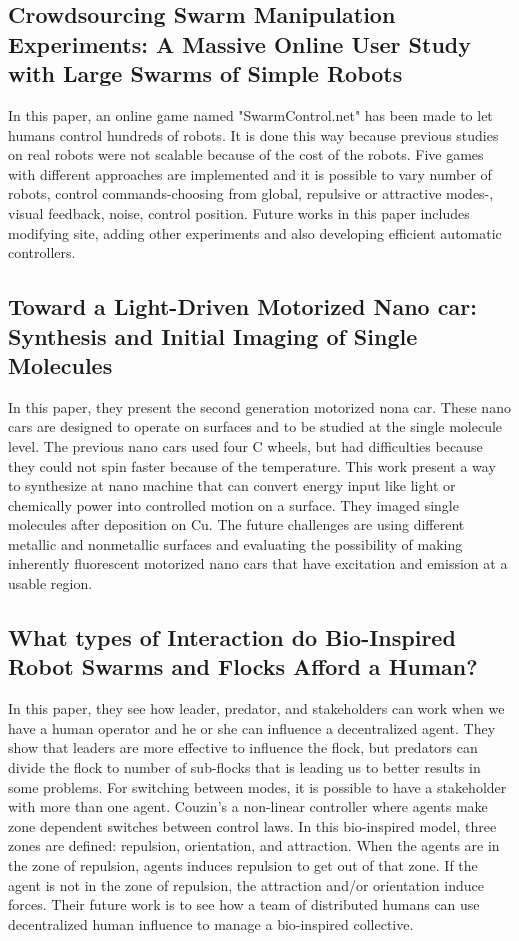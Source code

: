\documentclass[letterpaper, 10 pt, conference]{ieeeconf}
\begin{document}
\subsection{Crowdsourcing Swarm Manipulation Experiments: A Massive Online User Study with Large Swarms of Simple Robots}

In this paper, an online game named "SwarmControl.net" has been made to let humans control hundreds of robots. It is done this way because previous studies on real robots were not scalable because of the cost of the robots. Five games with different approaches are implemented and it is possible to vary number of robots, control commands-choosing from global, repulsive or attractive modes-, visual feedback, noise, control position. Future works in this paper includes modifying site, adding other experiments and also developing efficient automatic controllers. \cite{swarmcontrol2013}

\subsection{Toward a Light-Driven Motorized Nano car: Synthesis and Initial Imaging of Single Molecules}

In this paper, they present the second generation motorized nona car. These nano cars are designed to operate on surfaces and to be studied at the single molecule level. The previous nano cars used four C wheels, but had difficulties because they could not spin faster because of the temperature. This work present a way to synthesize at nano machine that can convert energy input like light or chemically power into controlled motion on a surface. They imaged single molecules after deposition on Cu. The future challenges are using different metallic and nonmetallic surfaces and evaluating the possibility of making inherently fluorescent motorized nano cars that have excitation and emission at a usable region. \cite{TourNanocar2012}

\subsection{What types of Interaction do Bio-Inspired Robot Swarms and Flocks Afford a Human?}

In this paper, they see how leader, predator, and stakeholders can work when we have a human operator and he or she can influence a decentralized agent. They show that leaders are more effective to influence the flock, but predators can divide the flock to number of sub-flocks that is leading us to better results in some problems. For switching between modes, it is possible to have a stakeholder with more than one agent. Couzin's a non-linear controller where agents make zone dependent switches between control laws. In this bio-inspired model, three zones are defined: repulsion, orientation, and attraction. When the agents are in the zone of repulsion, agents induces repulsion to get out of that zone. If the agent is not in the zone of repulsion, the attraction and/or orientation induce forces. Their future work is to see how a team of distributed humans can use decentralized human influence to manage a bio-inspired collective.\cite{Goodrich2012}
\end{document}
